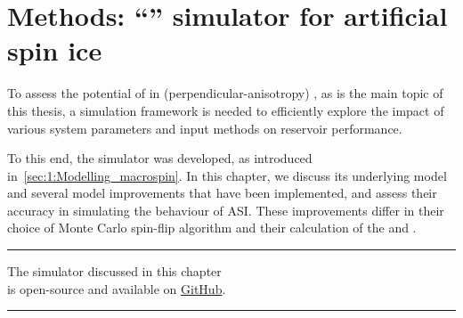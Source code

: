 \chapter{Methods: ``\hotspice'' simulator for artificial spin ice}\label{ch:Hotspice}

To assess the potential of  in (perpendicular-anisotropy) , as is the main topic of this thesis, a simulation framework is needed to efficiently explore the impact of various system parameters and input methods on reservoir performance. \par
To this end, the \hotspice simulator was developed, as introduced in~\cref{sec:1:Modelling_macrospin}.
In this chapter, we discuss its underlying model and several model improvements that have been implemented, and assess their accuracy in simulating the behaviour of ASI.
These improvements differ in their choice of Monte Carlo spin-flip algorithm and their calculation of the  and .

\vspace*{\fill}
\begin{center}
	\centering\rule{0.6\linewidth}{0.4pt}
\end{center}
\vspace{-1.5em}
\begin{center}
	The \hotspice simulator discussed in this chapter\\
	is open-source and available on \href{https://github.com/bvwaeyen/Hotspice}{GitHub}.
\end{center}
\vspace{-2.2em}
\begin{center}
	\centering\rule{0.6\linewidth}{0.4pt}
\end{center}
\vspace*{\fill}

